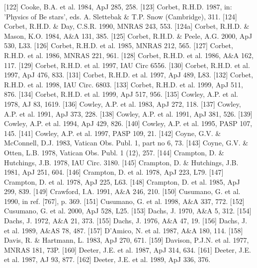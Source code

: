 \documentclass{aa}
\begin{document}
\begin{thebibliography}{}
\bibitem[]{}[122] Cooke, B.A. et al. 1984, ApJ 285, 258.
\bibitem[]{}[123] Corbet, R.H.D. 1987, in: 'Physics of Be stars', 
                                 eds. A. Slettebak \& T.P. Snow (Cambridge), 311.
\bibitem[]{}[124] Corbet, R.H.D. \& Day, C.S.R. 1990, MNRAS 243, 553.
\bibitem[]{}[124a] Corbet, R.H.D. \& Mason, K.O. 1984, A\&A 131, 385.
\bibitem[]{}[125] Corbet, R.H.D. \& Peele, A.G. 2000, ApJ 530, L33.
\bibitem[]{}[126] Corbet, R.H.D. et al. 1985, MNRAS 212, 565.
\bibitem[]{}[127] Corbet, R.H.D. et al. 1986, MNRAS 221, 961.
\bibitem[]{}[128] Corbet, R.H.D. et al. 1986, A\&A 162, 117.
\bibitem[]{}[129] Corbet, R.H.D. et al. 1997, IAU Circ 6556.
\bibitem[]{}[130] Corbet, R.H.D. et al. 1997, ApJ 476, 833.
\bibitem[]{}[131] Corbet, R.H.D. et al. 1997, ApJ 489, L83.
\bibitem[]{}[132] Corbet, R.H.D. et al. 1998, IAU Circ. 6803.
\bibitem[]{}[133] Corbet, R.H.D. et al. 1999, ApJ 511, 876.
\bibitem[]{}[134] Corbet, R.H.D. et al. 1999, ApJ 517, 956.
\bibitem[]{}[135] Cowley, A.P. et al. 1978, AJ 83, 1619.
\bibitem[]{}[136] Cowley, A.P. et al. 1983, ApJ 272, 118.
\bibitem[]{}[137] Cowley, A.P. et al. 1991, ApJ 373, 228.
\bibitem[]{}[138] Cowley, A.P. et al. 1991, ApJ 381, 526.
\bibitem[]{}[139] Cowley, A.P. et al. 1994, ApJ 429, 826.
\bibitem[]{}[140] Cowley, A.P. et al. 1995, PASP 107, 145.
\bibitem[]{}[141] Cowley, A.P. et al. 1997, PASP 109, 21.
\bibitem[]{}[142] Coyne, G.V. \& McConnell, D.J. 1983, Vatican Obs. Publ. 1, part no 6, 73.
\bibitem[]{}[143] Coyne, G.V. \& Otten, L.B. 1978, Vatican Obs. Publ. 1 (12), 257.
\bibitem[]{}[144] Crampton, D. \& Hutchings, J.B. 1978, IAU Circ. 3180.
\bibitem[]{}[145] Crampton, D. \& Hutchings, J.B. 1981, ApJ 251, 604.
\bibitem[]{}[146] Crampton, D. et al. 1978, ApJ 223, L79.
\bibitem[]{}[147] Crampton, D. et al. 1978, ApJ 225, L63.
\bibitem[]{}[148] Crampton, D. et al. 1985, ApJ 299, 839.
\bibitem[]{}[149] Crawford, I.A. 1991, A\&A 246, 210.
\bibitem[]{}[150] Cusumano, G. et al. 1990, in ref. [767], p. 369.
\bibitem[]{}[151] Cusumano, G. et al. 1998, A\&A 337, 772. 
\bibitem[]{}[152] Cusumano, G. et al. 2000, ApJ 528, L25.
\bibitem[]{}[153] Dachs, J. 1970, A\&A 5, 312.
\bibitem[]{}[154] Dachs, J. 1972, A\&A 21, 373.
\bibitem[]{}[155] Dachs, J. 1976, A\&A 47, 19.
\bibitem[]{}[156] Dachs, J. et al. 1989, A\&AS 78, 487.
\bibitem[]{}[157] D'Amico, N. et al. 1987, A\&A 180, 114.
\bibitem[]{}[158] Davis, R. \& Hartmann, L. 1983, ApJ 270, 671.
\bibitem[]{}[159] Davison, P.J.N. et al. 1977, MNRAS 181, 73P.
\bibitem[]{}[160] Deeter, J.E. et al. 1987, ApJ 314, 634.
\bibitem[]{}[161] Deeter, J.E. et al. 1987, AJ 93, 877.
\bibitem[]{}[162] Deeter, J.E. et al. 1989, ApJ 336, 376.

\end{thebibliography}
\end{document}
